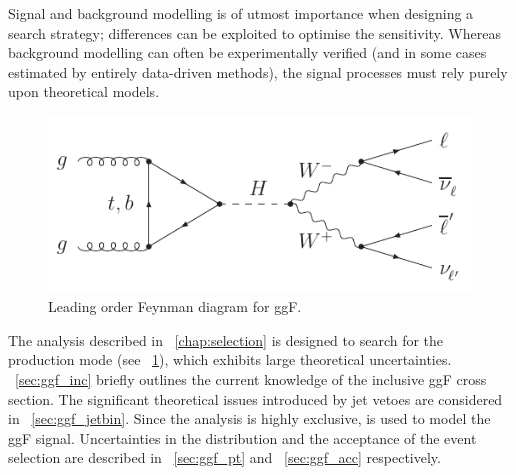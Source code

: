 
Signal and background modelling is of utmost importance when designing a search strategy; 
differences can be exploited to optimise the sensitivity. Whereas background modelling can 
often be experimentally verified (and in some cases estimated by entirely data-driven 
methods), the signal processes must rely purely upon theoretical models.

\begin{figure}[b]
	\includegraphics[width=\mediumfigwidth]{axodraw/ggf_WWlvlv.pdf}
	\caption{Leading order Feynman diagram for \acf{ggF}.}
	\label{fig:sig:ggF}
\end{figure}

The analysis described in \Chapter~\ref{chap:selection} is designed to search for the 
 production mode (see \Figure~\ref{fig:sig:ggF}), which exhibits large 
theoretical uncertainties. \Section~\ref{sec:ggf_inc} briefly outlines the current 
knowledge of the inclusive \ac{ggF} cross section. The significant theoretical issues 
introduced by jet vetoes are considered in \Section~\ref{sec:ggf_jetbin}. Since the \HWW 
analysis is highly exclusive,  is used to model the \ac{ggF} 
signal. Uncertainties in the \ptOf{\PHiggs} distribution and the acceptance of the event 
selection are described in \Section~\ref{sec:ggf_pt} and \Section~\ref{sec:ggf_acc} 
respectively.
